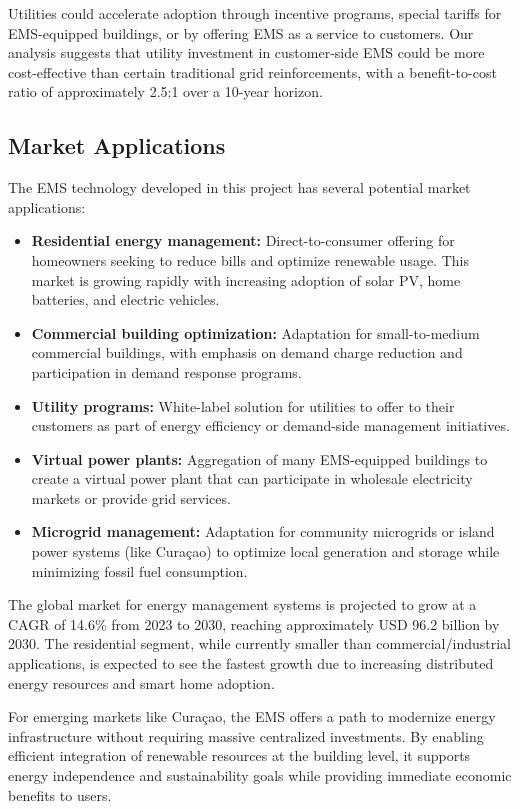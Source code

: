 \documentclass[12pt,a4paper]{article}
\begin{document}
Utilities could accelerate adoption through incentive programs, special tariffs for EMS-equipped buildings, or by offering EMS as a service to customers. Our analysis suggests that utility investment in customer-side EMS could be more cost-effective than certain traditional grid reinforcements, with a benefit-to-cost ratio of approximately 2.5:1 over a 10-year horizon.

\subsection{Market Applications}

The EMS technology developed in this project has several potential market applications:

\begin{itemize}
    \item \textbf{Residential energy management:} Direct-to-consumer offering for homeowners seeking to reduce bills and optimize renewable usage. This market is growing rapidly with increasing adoption of solar PV, home batteries, and electric vehicles.
    \item \textbf{Commercial building optimization:} Adaptation for small-to-medium commercial buildings, with emphasis on demand charge reduction and participation in demand response programs.
    \item \textbf{Utility programs:} White-label solution for utilities to offer to their customers as part of energy efficiency or demand-side management initiatives.
    \item \textbf{Virtual power plants:} Aggregation of many EMS-equipped buildings to create a virtual power plant that can participate in wholesale electricity markets or provide grid services.
    \item \textbf{Microgrid management:} Adaptation for community microgrids or island power systems (like Curaçao) to optimize local generation and storage while minimizing fossil fuel consumption.
\end{itemize}

The global market for energy management systems is projected to grow at a CAGR of 14.6\% from 2023 to 2030, reaching approximately USD 96.2 billion by 2030. The residential segment, while currently smaller than commercial/industrial applications, is expected to see the fastest growth due to increasing distributed energy resources and smart home adoption.

For emerging markets like Curaçao, the EMS offers a path to modernize energy infrastructure without requiring massive centralized investments. By enabling efficient integration of renewable resources at the building level, it supports energy independence and sustainability goals while providing immediate economic benefits to users.
\end{document}
